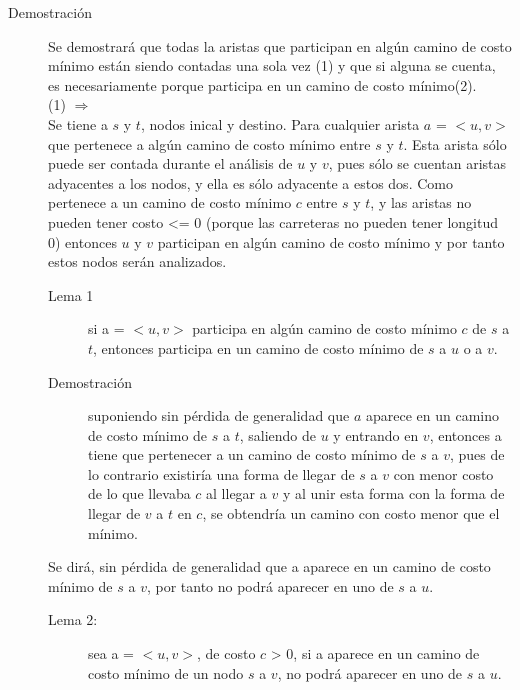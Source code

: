 \documentclass[a4paper,12pt,twocolumn]{article}
\begin{document}
	
	\begin{description}
		\item[Demostración] Se demostrará que todas la aristas que participan en algún camino de costo mínimo están siendo contadas una sola vez (1) y que si alguna se cuenta, es necesariamente porque participa en un camino de costo mínimo(2).\\
		
		(1) $\Rightarrow$\\
		Se tiene a $s$ y $t$, nodos inical y destino. Para cualquier arista $a$ = $<u, v>$ que pertenece a algún camino de costo mínimo entre $s$ y $t$. Esta arista sólo puede ser contada durante el análisis de $u$ y $v$, pues sólo se cuentan aristas adyacentes a los nodos, y ella es sólo adyacente a estos dos. Como pertenece a un camino de costo mínimo $c$ entre $s$ y $t$, y las aristas no pueden tener costo <= 0 (porque las carreteras no pueden tener longitud 0) entonces $u$ y $v$ participan en algún camino de costo mínimo y por tanto estos nodos serán analizados.\\
		
		\begin{description}
			\item[Lema 1] si a = $<u, v>$ participa en algún camino de costo mínimo $c$ de $s$ a $t$, entonces participa en un camino de costo mínimo de $s$ a $u$ o a $v$.
		\end{description}
		
		\begin{description}
			\item[Demostración] suponiendo sin pérdida de generalidad que $a$ aparece en un camino de costo mínimo de $s$ a $t$, saliendo de $u$ y entrando en $v$, entonces a tiene que pertenecer a un camino de costo mínimo de $s$ a $v$, pues de lo contrario existiría una forma de llegar de $s$ a $v$ con menor costo de lo que llevaba $c$ al llegar a $v$ y al unir esta forma con la forma de llegar de $v$ a $t$ en $c$, se obtendría un camino con costo menor que el mínimo.
		\end{description}
		
		Se dirá, sin pérdida de generalidad que a aparece en un camino de costo mínimo de $s$ a $v$, por tanto no podrá aparecer en uno de $s$ a $u$.
		
		\begin{description}
			\item[Lema 2:] sea a = $<u, v>$, de costo $c$ > 0, si a aparece en un camino de costo mínimo de un nodo $s$ a $v$, no podrá aparecer en uno de $s$ a $u$.
		\end{description}
		

\end{description}
\end{document}
